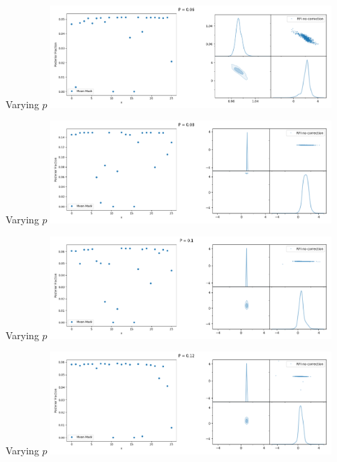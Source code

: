 \documentclass[aspectratio=169]{beamer}
\begin{document}
\begin{frame}{Varying $p$}
    \centering
    \includegraphics[width=0.8\textwidth]{images/gif_anest/comb_4.png}
\end{frame}

\begin{frame}{Varying $p$}
    \centering
    \includegraphics[width=0.8\textwidth]{images/gif_anest/comb_5.png}
\end{frame}

\begin{frame}{Varying $p$}
    \centering
    \includegraphics[width=0.8\textwidth]{images/gif_anest/comb_6.png}
\end{frame}

\begin{frame}{Varying $p$}
    \centering
    \includegraphics[width=0.8\textwidth]{images/gif_anest/comb_7.png}
\end{frame}
\end{document}

